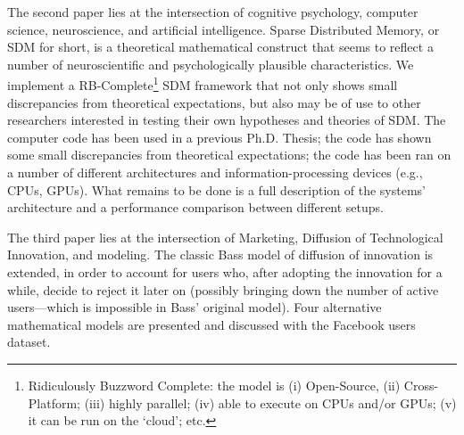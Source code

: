 \documentclass[12pt]{article}
\begin{document}
The second paper lies at the intersection of cognitive psychology, computer science, neuroscience, and artificial intelligence.  Sparse Distributed Memory, or SDM for short, is a theoretical mathematical construct that seems to reflect a number of neuroscientific and psychologically plausible characteristics. We implement a RB-Complete\footnote{Ridiculously Buzzword Complete: the model is (i) Open-Source, (ii) Cross-Platform; (iii) highly parallel; (iv) able to execute on CPUs and/or GPUs; (v) it can be run on the `cloud'; etc.} SDM framework that not only shows small discrepancies from theoretical expectations, but also may be of use to other researchers interested in testing their own hypotheses and theories of SDM. The computer code has been used in a previous Ph.D. Thesis; the code has shown some small discrepancies from theoretical expectations; the code has been ran on a number of different architectures and information-processing devices (e.g., CPUs, GPUs).  What remains to be done is a full description of the systems' architecture and a performance comparison between different setups.

The third paper lies at the intersection of Marketing, Diffusion of Technological Innovation, and modeling. The classic Bass model of diffusion of innovation is extended, in order to account for users who, after adopting the innovation for a while, decide to reject it later on (possibly bringing down the number of active users---which is impossible in Bass' original model). Four alternative mathematical models are presented and discussed with the Facebook users dataset. %
\end{document}
